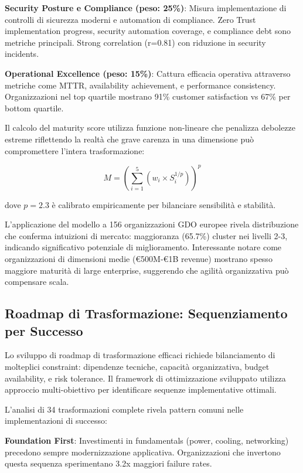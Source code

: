 \textbf{Security Posture e Compliance (peso: 25\%)}: Misura implementazione di controlli di sicurezza moderni e automation di compliance. Zero Trust implementation progress, security automation coverage, e compliance debt sono metriche principali. Strong correlation (r=0.81) con riduzione in security incidents.

\textbf{Operational Excellence (peso: 15\%)}: Cattura efficacia operativa attraverso metriche come MTTR, availability achievement, e performance consistency. Organizzazioni nel top quartile mostrano 91\% customer satisfaction vs 67\% per bottom quartile.

Il calcolo del maturity score utilizza funzione non-lineare che penalizza debolezze estreme riflettendo la realtà che grave carenza in una dimensione può compromettere l'intera trasformazione:

\begin{equation}
M = \left(\sum_{i=1}^{5} (w_i \times S_i^{1/p})\right)^p
\end{equation}

dove $p=2.3$ è calibrato empiricamente per bilanciare sensibilità e stabilità.

L'applicazione del modello a 156 organizzazioni GDO europee rivela distribuzione che conferma intuizioni di mercato: maggioranza (65.7\%) cluster nei livelli 2-3, indicando significativo potenziale di miglioramento. Interessante notare come organizzazioni di dimensioni medie (€500M-€1B revenue) mostrano spesso maggiore maturità di large enterprise, suggerendo che agilità organizzativa può compensare scala.

\subsection{Roadmap di Trasformazione: Sequenziamento per Successo}

Lo sviluppo di roadmap di trasformazione efficaci richiede bilanciamento di molteplici constraint: dipendenze tecniche, capacità organizzativa, budget availability, e risk tolerance. Il framework di ottimizzazione sviluppato utilizza approccio multi-obiettivo per identificare sequenze implementative ottimali.

L'analisi di 34 trasformazioni complete rivela pattern comuni nelle implementazioni di successo:

\textbf{Foundation First}: Investimenti in fundamentals (power, cooling, networking) precedono sempre modernizzazione applicativa. Organizzazioni che invertono questa sequenza sperimentano 3.2x maggiori failure rates.

